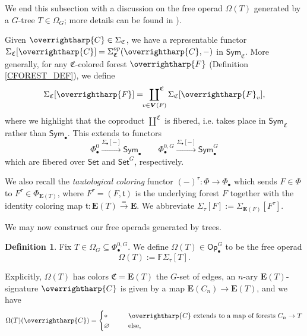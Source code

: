\documentclass[a4paper,10pt
,draft
]{article}%
\numberwithin{equation}{section}
\numberwithin{figure}{section}
\theoremstyle{definition} %
\newtheorem{definition}[equation]{Definition}%
\newcommand{\vect}[1]{\text{\overrightharp{\ensuremath{#1}}}}
\newcommand{\Sym}{\ensuremath{\mathsf{Sym}}}%
\newcommand{\Set}{\ensuremath{\mathsf{Set}}}
\newcommand{\Op}{\mathsf{Op}}%
\newcommand{\1}{\ensuremath{\mathbbm 1}}%
\begin{document}
We end this subsection with a discussion on the free operad $\Omega(T)$ generated by a $G$-tree $T \in \Omega_G$;
more details can be found in \cite[\S 2.3.1 and \S 4.2]{BP_HGOP}). %

Given $\vect C \in \Sigma_{\mathfrak C}$, we have a representable functor $\Sigma_{\mathfrak C}[\vect C] = \Sigma_{\mathfrak C}^{op}(\vect C, -)$ in $\Sym_{\mathfrak C}$.
More generally, for any $\mathfrak C$-colored forest $\vect F$ (Definition \ref{CFOREST_DEF}), we define
\[
      \Sigma_{\mathfrak C}[\vect F] = \sideset{}{^{\mathfrak C}}\coprod_{v \in \boldsymbol{V}(F)} \Sigma_{\mathfrak C}[\vect F_v],
\]
where we highlight that the coproduct $\amalg^{\mathfrak C}$ is fibered, i.e. takes place in $\Sym_{\mathfrak C}$ rather than $\Sym_\bullet$.
This extends to functors
\[
      \Phi_\bullet^0 \xrightarrow{\Sigma_\bullet[-]} \Sym_\bullet
      \qquad
      \Phi_\bullet^{0,G} \xrightarrow{\Sigma_\bullet[-]} \Sym_\bullet^G
\]
which are fibered over $\Set$ and $\Set^G$, respectively.

We also recall the \textit{tautological coloring} functor $(-)^\tau \colon \Phi \to \Phi_{\bullet}$
which sends $F \in \Phi$ to $F^\tau \in \Phi_{\boldsymbol{E}(T)}$,
where $F^\tau = (F,\mathfrak t)$ is the underlying forest $F$ together with the identity coloring map $\mathfrak t \colon \boldsymbol{E}(T) \xrightarrow{=} \boldsymbol{E}$.
We abbreviate $\Sigma_\tau[F] := \Sigma_{\boldsymbol{E}(F)}[F^\tau]$.

We may now construct our free operads generated by trees.

\begin{definition}
      \label{OT_DEF}
      Fix $T \in \Omega_G \subseteq \Phi^{0,G}_\bullet$.
      We define $\Omega(T) \in \Op_\bullet^G$ to be the free operad
      \[
            \Omega(T) := \mathbb F \Sigma_\tau[T].
      \]
\end{definition}
Explicitly, $\Omega(T)$ has colors $\mathfrak C = \boldsymbol{E}(T)$ the $G$-set of edges,
an $n$-ary $\boldsymbol{E}(T)$-signature $\vect C$ is given by a map $\boldsymbol{E}(C_n) \to \boldsymbol{E}(T)$,
and we have
\begin{equation}
      \label{OMEGADEF_EQ}
      \Omega(T)(\vect C) =
      \begin{cases}
            \** \qquad & \mbox{$\vect C$ extends to a map of forests $C_n \to T$}
            \\
            \varnothing & \text{else,}
      \end{cases}
\end{equation}
\end{document}
